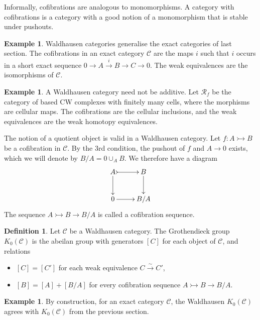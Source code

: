 \documentclass[10pt,a4paper]{article}
\theoremstyle{definition}
\newtheorem{example}[theorem]{Example}
\newtheorem{definition}[theorem]{Definition}
\begin{document}
Informally, cofibrations are analogous to monomorphisms. A category with cofibrations is a category with a good notion of a monomorphism that is stable under pushouts.

\begin{example}
Waldhausen categories generalise the exact categories of last section. The cofibrations in an exact category $\mathcal{C}$ are the maps $i$ such that $i$ occurs in a short exact sequence $0 \to A \xrightarrow{i} B \to C \to 0$. The weak equivalences are the isomorphisms of $\mathcal{C}$.
\end{example}

\begin{example}
A Waldhausen category need not be additive. Let $\mathcal{R}_f$ be the category of based CW complexes with finitely many cells, where the morphisms are cellular maps. The cofibrations are the cellular inclusions, and the weak equivalences are the weak homotopy equivalences.
\end{example}

The notion of a quotient object is valid in a Waldhausen category. Let $f : A \rightarrowtail B$ be a cofibration in $\mathcal{C}$. By the 3rd condition, the pushout of $f$ and $A \to 0$ exists, which we will denote by $B/A = 0 \cup_A B$. We therefore have a diagram
\begin{displaymath}
    \xymatrix{
    A \ar@{>->}[r] \ar[d] & B \ar[d] \\
    0 \ar[r] & B/A
    }
\end{displaymath}
The sequence $A \rightarrowtail B \to B/A$ is called a cofibration sequence.

\begin{definition}
Let $\mathcal{C}$ be a Waldhausen category. The Grothendieck group $K_0(\mathcal{C})$ is the abeilan group with generators $[C]$ for each object of $\mathcal{C}$, and relations 
\begin{itemize}
\itemsep0em
\item $[C] = [C']$ for each weak equivalence $C \xrightarrow{\sim} C'$, 
\item $[B] = [A] + [B/A]$ for every cofibration sequence $A \rightarrowtail B \to B/A$.
\end{itemize}
\end{definition}

\begin{example}
By construction, for an exact category $\mathcal{C}$, the Waldhausen $K_0(\mathcal{C})$ agrees with $K_0(\mathcal{C})$ from the previous section.
\end{example}
\end{document}
